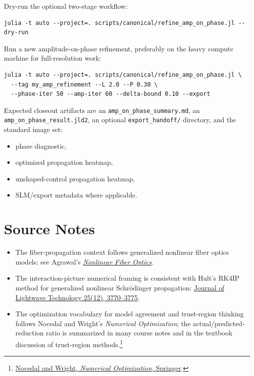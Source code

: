 \documentclass[11pt]{article}
\newcommand{\noteurl}[2]{\href{#1}{#2}}
\begin{document}
Dry-run the optional two-stage workflow:
\begin{verbatim}
julia -t auto --project=. scripts/canonical/refine_amp_on_phase.jl --dry-run
\end{verbatim}

Run a new amplitude-on-phase refinement, preferably on the heavy compute machine for full-resolution work:
\begin{verbatim}
julia -t auto --project=. scripts/canonical/refine_amp_on_phase.jl \
  --tag my_amp_refinement --L 2.0 --P 0.30 \
  --phase-iter 50 --amp-iter 60 --delta-bound 0.10 --export
\end{verbatim}

Expected closeout artifacts are an \texttt{amp\_on\_phase\_summary.md}, an \texttt{amp\_on\_phase\_result.jld2}, an optional \texttt{export\_handoff/} directory, and the standard image set:
\begin{itemize}
    \item phase diagnostic,
    \item optimized propagation heatmap,
    \item unshaped-control propagation heatmap,
    \item SLM/export metadata where applicable.
\end{itemize}

\section{Source Notes}
\begin{itemize}
    \item The fiber-propagation context follows generalized nonlinear fiber optics models; see Agrawal's \noteurl{https://www.sciencedirect.com/book/monograph/9780128170427/nonlinear-fiber-optics}{\emph{Nonlinear Fiber Optics}}.
    \item The interaction-picture numerical framing is consistent with Hult's RK4IP method for generalized nonlinear Schrödinger propagation: \noteurl{https://opg.optica.org/abstract.cfm?URI=JLT-25-12-3770}{Journal of Lightwave Technology 25(12), 3770--3775}.
    \item The optimization vocabulary for model agreement and trust-region thinking follows Nocedal and Wright's \emph{Numerical Optimization}; the actual/predicted-reduction ratio is summarized in many course notes and in the textbook discussion of trust-region methods.\footnote{\noteurl{https://link.springer.com/book/10.1007/978-0-387-40065-5}{Nocedal and Wright, \emph{Numerical Optimization}, Springer}.}
\end{itemize}
\end{document}

